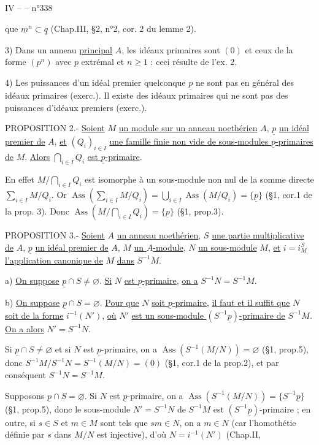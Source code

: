 
IV --  -- \hfill n°338

que $\underline m^n\subset\underline q$ (Chap.III, §2, n°2, cor. 2 du lemme 2).

3) Dans un anneau \uline{principal} $A$, les idéaux primaires sont $(0)$ et ceux de la forme $(p^n)$ avec $p$ extrémal et $n\geq1$ : ceci résulte de l'ex. 2.

4) Les puissances d'un idéal premier quelconque $\underline p$ ne sont pas en général des idéaux primaires (exerc.\quad). Il existe des idéaux primaires qui ne sont pas des puissances d'idéaux premiers (exerc.\quad).


PROPOSITION 2.- \uline{Soient} $M$ \uline{un module sur un anneau noethérien} $A$, $\underline p$ \uline{un idéal premier de} $A$, \uline{et} $(Q_i)_{i\in I}$ \uline{une famille finie non vide de sous-modules $\underline p$-primaires de} $M$. \uline{Alors} $\bigcap_{i\in I}Q_i$ \uline{est $\underline p$-primaire}.

En effet $M/\bigcap_{i\in I}Q_i$ est isomorphe à un sous-module non nul de la somme directe $\sum_{i\in I}M/Q_i$. Or $\operatorname{Ass}(\sum_{i\in I}M/Q_i)=\bigcup_{i\in I}\operatorname{Ass}(M/Q_i)=\{\underline p\}$ (§1, cor.1 de la prop. 3). Donc $\operatorname{Ass}(M/\bigcap_{i\in I}Q_i)=\{\underline p\}$ (§1, prop.3).

PROPOSITION 3.- \uline{Soient} $A$ \uline{un anneau noethérien}, $S$ \uline{une partie multiplicative de} $A$, $\underline p$ \uline{un idéal premier de} $A$, $M$ \uline{un $A$-module}, $N$ \uline{un sous-module} $M$, \uline{et} $i=i_M^S$ \uline{l'application canonique de} $M$ \uline{dans} $S^{-1}M$.


a) \uline{On suppose} $\underline p\cap S\neq\varnothing$. \uline{Si} $N$ \uline{est $\underline p$-primaire}, \uline{on a} $S^{-1}N=S^{-1}M$.

b) \uline{On suppose} $\underline p\cap S=\varnothing$. \uline{Pour que} $N$ \uline{soit $\underline p$-primaire}, \uline{il faut et il suffit que} $N$ \uline{soit de la forme} $i^{-1}(N')$, \uline{où} $N'$ \uline{est un sous-module $(S^{-1}\underline p)$-primaire de} $S^{-1}M$. \uline{On a alors} $N'=S^{-1}N$.

Si $\underline p\cap S\neq\varnothing$ et si $N$ est $\underline p$-primaire, on a $\operatorname{Ass}(S^{-1}(M/N))=\varnothing$ (§1, prop.5), donc $S^{-1}M/S^{-1}N=S^{-1}(M/N)=(0)$ (§1, cor.1 de la prop.2), et par conséquent $S^{-1}N=S^{-1}M$.

Supposons $\underline p\cap S=\varnothing$. Si $N$ est $\underline p$-primaire, on a $\operatorname{Ass}(S^{-1}(M/N))=\{S^{-1}\underline p\}$ (§1, prop.5), donc le sous-module $N'=S^{-1}N$ de $S^{-1}M$ est $(S^{-1}\underline p)$-primaire ; en outre, si $s\in S$ et $m\in M$ sont tels que $sm\in N$, on a $m\in N$ (car l'homothétie définie par $s$ dans $M/N$ est injective), d'où $N=i^{-1}(N')$ (Chap.II,

